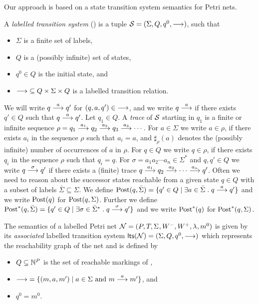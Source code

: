 Our approach is based on a state transition system semantics for Petri nets.

\begin{definition}
A \emph{labelled transition system} (\LTS) is a tuple $\S = (\Sigma, Q, q^0, \goes{})$, such that
\begin{itemize}
    \item $\Sigma$ is a finite set of labels, 
    \item $Q$ is a (possibly infinite) set of states, 
    \item $q^0 \in Q$ is the initial state, and
    \item $\goes{} \; \subseteq Q \times \Sigma \times Q$ is a labelled transition relation.
\end{itemize}
    
\end{definition}
We will write $q \goes{a} q'$ for $(q,a,q') \in \;\goes{}$, and we write $q \goes{a}$ if there exists $q' \in Q$ such that $q \goes{a} q'$. 
Let $q_1 \in Q$. A \emph{trace} of $\S$ starting in $q_1$ is a finite or infinite sequence $\rho =q_1  \goes{a_1} q_2 \goes{a_2} q_3 \goes{a_3} \cdots$.
For $a \in \Sigma$ we write $a \in \rho$, if there exists $a_i$ in the sequence $\rho$ such that $a_i = a$, and $\sharp_\rho(a)$ denotes the (possibly infinite) number of occurrences of $a$ in $\rho$. 
For $q \in Q$ we write $q \in \rho$, if there exists $q_i$ in the sequence $\rho$ such that $q_i = q$.
For $\sigma=a_1 a_2 \cdots a_n \in \Sigma^*$ and $q,q'\in Q$ we write $q \goes{\sigma} q'$ if there exists a (finite) trace $q \goes{a_1} q_2 \goes{a_2} \cdots \goes{a_n} q'$. 
Often we need to reason about the successor states reachable from a given state $q \in Q$ with a subset of labels $\bar\Sigma \subseteq \Sigma$. 
We define $\post(q,\bar\Sigma) = \{q' \in Q \mid \exists a\in \bar\Sigma \; . \; q \goes{a} q'\}$ and we write $\post(q)$ for $\post(q,\Sigma)$. 
Further we define $\post^*(q,\bar\Sigma)  = \{q' \in Q \mid \exists \sigma \in \bar\Sigma^* \; . \; q \goes{\sigma} q'\}$ and we write $\post^*(q) $ for $ \post^*(q,\Sigma)$.

\begin{definition}
The semantics of a labelled Petri net $\pnN = \pntup{}$ is given by its \emph{associated} labelled transition system
$\lts(\pnN) = (\Sigma, Q, q^0, \goes{})$ which represents the reachability graph of the net and is defined by
    \begin{itemize}
        \item $Q \subseteq \N^P$ is the set of reachable markings of \pnN,
        \item $\goes{} \; = \{(m, a, m') \mid a \in \Sigma \text{ and } m \goes{a} m'\}$, and
        \item $q^0 = m^0$.
    \end{itemize}    
\end{definition}


